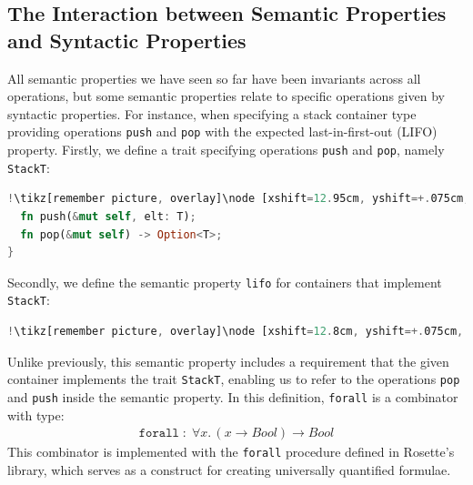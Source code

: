 \subsection{The Interaction between Semantic Properties and Syntactic Properties}
\label{chap2:prop:semantic-syntactic}
All semantic properties we have seen so far have been invariants across all operations, but 
some semantic properties relate to specific operations given by syntactic properties. 
For instance, when specifying a stack container type providing operations \lstinline{push} and \lstinline{pop} with the expected last-in-first-out (LIFO) property.
Firstly, we define a trait specifying operations \lstinline{push} and \lstinline{pop}, namely \lstinline{StackT}:
\begin{lstlisting}[language=Rust, style=boxed, caption=The trait \mylstinline{StackT} specifying operations \mylstinline{push} and \mylstinline{pop}, captionpos=t, label=prop:spec-stackt, escapechar=!]
!\tikz[remember picture, overlay]\node [xshift=12.95cm, yshift=+.075cm, inner sep=0.075cm, rectangle] {\footnotesize\bfseries\texttt{Rust}};!pub trait StackT<T> {
  fn push(&mut self, elt: T);
  fn pop(&mut self) -> Option<T>;
}
\end{lstlisting}
Secondly, we define the semantic property \lstinline{lifo} for containers that implement \lstinline{StackT}:
\begin{lstlisting}[language=Rust, style=boxed, caption=The semantic property LIFO, captionpos=t, label=prop:spec-lifo, escapechar=!]
!\tikz[remember picture, overlay]\node [xshift=12.8cm, yshift=+.075cm, inner sep=0.075cm, rectangle] {\footnotesize\bfseries\texttt{Primrose}};!property lifo { \c <: StackT -> (forall \x. pop (push c x) == x) }
\end{lstlisting}
\noindent
Unlike previously, this semantic property includes a requirement that the given container implements the trait \lstinline{StackT}, enabling us to refer to the operations \lstinline{pop} and \lstinline{push} inside the semantic property. In this definition, \lstinline{forall} is a combinator with type:
\begin{align}
    \label{prop:combinator-forall}
    \texttt{forall}\; :\; \forall x. \,(x \to \mathit{Bool}) \to \mathit{Bool}
\end{align}
This combinator is implemented with the \lstinline{forall} procedure defined in Rosette's library, which serves as a construct for creating universally quantified formulae.

